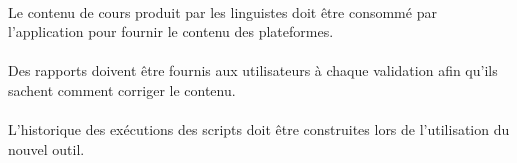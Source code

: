     \paragraph{}
    Le contenu de cours produit par les linguistes doit être consommé par l'application pour fournir le contenu des plateformes.
    
    \paragraph{}
    Des rapports doivent être fournis aux utilisateurs à chaque validation afin qu'ils sachent comment corriger le contenu.
    
    \paragraph{}
    L'historique des exécutions des scripts doit être construites lors de l'utilisation du nouvel outil.
    